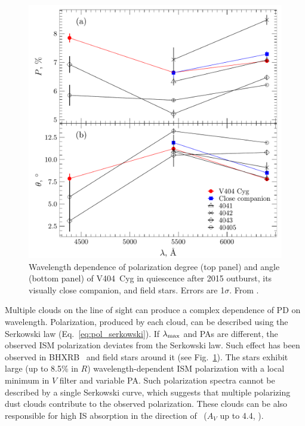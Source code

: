 \begin{figure}
    \centering
    \includegraphics[keepaspectratio, width = 0.95\linewidth]{images/field__7.pdf}
    \caption{
        Wavelength dependence of polarization degree (top panel) and angle (bottom panel) of V404~Cyg in quiescence after 2015 outburst, its visually close companion, and field stars.
        Errors are 1$\sigma$.
        From \paperII.
    }
    \label{fig:pol_v404_field}
\end{figure}
Multiple clouds on the line of sight can produce a complex dependence of \gls{PD} on wavelength.
Polarization, produced by each cloud, can be described using the Serkowski law (Eq.~\ref{eq:pol_serkowski}).
If $\lambda_{\mathrm{max}}$ and \glspl{PA} are different, the observed \gls{ISM} polarization deviates from the Serkowski law.
Such effect has been observed in \gls{BHXRB} \VCYG\ and field stars around it (see Fig.~\ref{fig:pol_v404_field}).
The stars exhibit large (up to 8.5\% in $R$) wavelength-dependent \gls{ISM} polarization with a local minimum in $V$ filter and variable \gls{PA}. 
Such polarization spectra cannot be described by a single Serkowski curve, which suggests that multiple polarizing dust clouds contribute to the observed polarization.
These clouds can be also responsible for high \gls{IS} absorption in the direction of \VCYG\ ($A_V$ up to 4.4, \citealt{Shahbaz2003}).

